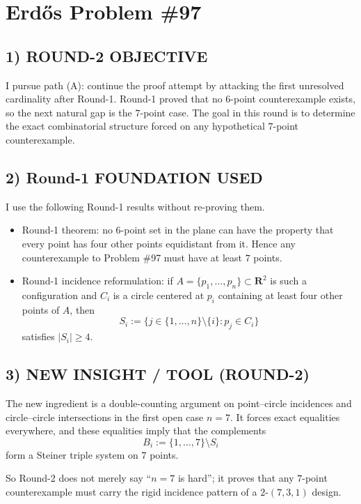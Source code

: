 \section{Erd\H{o}s Problem \#97}

\subsection*{1) ROUND-2 OBJECTIVE}

I pursue path (A): continue the proof attempt by attacking the first unresolved cardinality after Round-1. Round-1 proved that no $6$-point counterexample exists, so the next natural gap is the $7$-point case. The goal in this round is to determine the exact combinatorial structure forced on any hypothetical $7$-point counterexample.

\subsection*{2) Round-1 FOUNDATION USED}

I use the following Round-1 results without re-proving them.

\begin{itemize}
\item Round-1 theorem: no $6$-point set in the plane can have the property that every point has four other points equidistant from it. Hence any counterexample to Problem \#97 must have at least $7$ points.
\item Round-1 incidence reformulation: if $A=\{p_1,\dots,p_n\}\subset \mathbf{R}^2$ is such a configuration and $C_i$ is a circle centered at $p_i$ containing at least four other points of $A$, then
\[
S_i:=\{j\in\{1,\dots,n\}\setminus\{i\}: p_j\in C_i\}
\]
satisfies $|S_i|\ge 4$.
\end{itemize}

\subsection*{3) NEW INSIGHT / TOOL (ROUND-2)}

The new ingredient is a double-counting argument on point--circle incidences and circle--circle intersections in the first open case $n=7$. It forces exact equalities everywhere, and these equalities imply that the complements
\[
B_i:=\{1,\dots,7\}\setminus S_i
\]
form a Steiner triple system on $7$ points.

So Round-2 does not merely say ``$n=7$ is hard''; it proves that any $7$-point counterexample must carry the rigid incidence pattern of a $2$-$(7,3,1)$ design.

